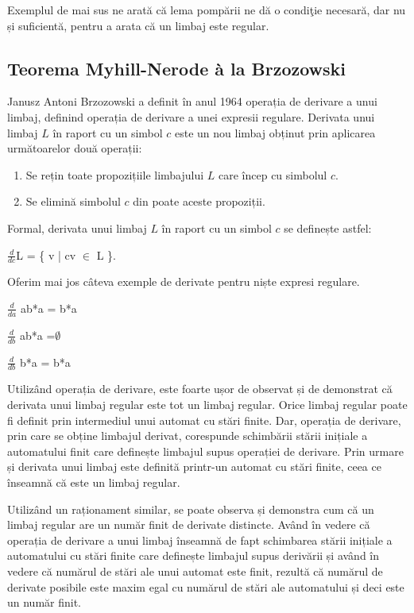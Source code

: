Exemplul de mai sus ne arată că lema pompării ne dă o condiţie necesară, dar nu și suficientă, pentru a arata că un limbaj este regular.

\subsection{Teorema Myhill-Nerode à la Brzozowski}

Janusz Antoni Brzozowski a definit în anul 1964 operația de derivare a unui limbaj, definind operația de derivare a unei expresii regulare. Derivata unui limbaj $L$ în raport cu un simbol $c$ este un nou limbaj obținut prin aplicarea următoarelor două operații:

\begin{enumerate}
\item
Se rețin toate propozițiile limbajului $L$ care încep cu simbolul $c$.
\item
Se elimină simbolul $c$ din poate aceste propoziții.
\end{enumerate}

Formal, derivata unui limbaj $L$ în raport cu un simbol $c$ se definește astfel:

$\frac{d}{ dc}$L = \{ v | cv $\in$ L \}.

Oferim mai jos câteva exemple de derivate pentru niște expresi regulare.

$\frac{d}{da}$ ab*a = b*a

$\frac{d}{db}$ ab*a =$\emptyset$

$\frac{d}{db}$ b*a = b*a

Utilizând operația de derivare, este foarte ușor de observat și de demonstrat că derivata unui limbaj regular este tot un limbaj regular. Orice limbaj regular poate fi definit prin intermediul unui automat cu stări finite. Dar, operația de derivare, prin care se obține limbajul derivat, corespunde schimbării stării inițiale a automatului finit care definește limbajul supus operației de derivare. Prin urmare și derivata unui limbaj este definită printr-un automat cu stări finite, ceea ce înseamnă că este un limbaj regular.

Utilizând un raționament similar, se poate observa și demonstra cum că un limbaj regular are un număr finit de derivate distincte. Având în vedere că operația de derivare a unui limbaj înseamnă de fapt schimbarea stării inițiale a automatului cu stări finite care definește limbajul supus derivării și având în vedere că numărul de stări ale unui automat este finit, rezultă că numărul de derivate posibile este maxim egal cu numărul de stări ale automatului și deci este un număr finit.

